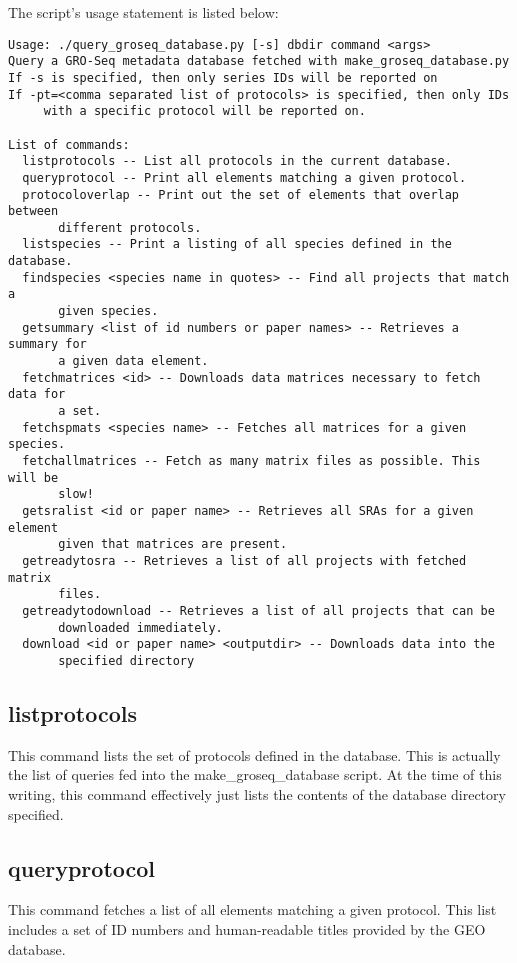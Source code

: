 \documentclass[12pt,letterpaper]{article}
\begin{document}
The script's usage statement is listed below:
\begin{verbatim}
Usage: ./query_groseq_database.py [-s] dbdir command <args>
Query a GRO-Seq metadata database fetched with make_groseq_database.py
If -s is specified, then only series IDs will be reported on
If -pt=<comma separated list of protocols> is specified, then only IDs 
     with a specific protocol will be reported on.

List of commands:
  listprotocols -- List all protocols in the current database.
  queryprotocol -- Print all elements matching a given protocol.
  protocoloverlap -- Print out the set of elements that overlap between 
       different protocols.
  listspecies -- Print a listing of all species defined in the database.
  findspecies <species name in quotes> -- Find all projects that match a 
       given species.
  getsummary <list of id numbers or paper names> -- Retrieves a summary for 
       a given data element.
  fetchmatrices <id> -- Downloads data matrices necessary to fetch data for 
       a set.
  fetchspmats <species name> -- Fetches all matrices for a given species.
  fetchallmatrices -- Fetch as many matrix files as possible. This will be 
       slow!
  getsralist <id or paper name> -- Retrieves all SRAs for a given element 
       given that matrices are present.
  getreadytosra -- Retrieves a list of all projects with fetched matrix 
       files.
  getreadytodownload -- Retrieves a list of all projects that can be 
       downloaded immediately.
  download <id or paper name> <outputdir> -- Downloads data into the 
       specified directory
\end{verbatim}

\subsection{listprotocols}
This command lists the set of protocols defined in the database. This is actually the list of queries fed into the make\_groseq\_database script. 
At the time of this writing, this command effectively just lists the contents of the database directory specified.

\subsection{queryprotocol}
This command fetches a list of all elements matching a given protocol. This list includes a set of ID numbers and human-readable titles provided by the GEO database.
\end{document}
